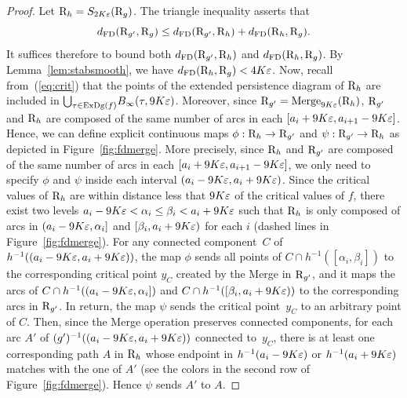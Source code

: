 \begin{proof}
Let $\mathrm{R}_h=S_{2K\varepsilon}(\mathrm{R}_g)$.
The triangle inequality asserts that 
\[
d_{\rm FD}(\mathrm{R}_{g'},\mathrm{R}_g)\leq d_{\rm FD}(\mathrm{R}_{g'},\mathrm{R}_h)+d_{\rm FD}(\mathrm{R}_h,\mathrm{R}_g).
\]
It suffices therefore to bound both
$d_{\rm FD}(\mathrm{R}_{g'},\mathrm{R}_h)$ and $d_{\rm FD}(\mathrm{R}_h,\mathrm{R}_{g})$.
By Lemma~\ref{lem:stabsmooth}, we have $d_{\rm FD}(\mathrm{R}_h,\mathrm{R}_g) < 4K\varepsilon$.
Now, recall from~(\ref{eq:crit}) that the points of the extended
persistence diagram of $\mathrm{R}_h$ are included in
${\bigcup}_{\tau\in\mathrm{ExDg}(f)} B_\infty(\tau,9K\varepsilon)$.  Moreover, since
$\mathrm{R}_{g'}=\mathrm{Merge}_{9K\varepsilon}(\mathrm{R}_h)$, $\mathrm{R}_{g'}$ and $\mathrm{R}_h$ are
composed of the same number of arcs in each $[a_i+9K\varepsilon,a_{i+1}-9K\varepsilon]$.
Hence, we can define explicit continuous maps
$\phi:\mathrm{R}_h\rightarrow\mathrm{R}_{g'}$ and
$\psi:\mathrm{R}_{g'}\rightarrow\mathrm{R}_h$ as depicted in
Figure~\ref{fig:fdmerge}.  More precisely, since $\mathrm{R}_h$ and
$\mathrm{R}_{g'}$ are composed of the same number of arcs in each
$[a_i+9K\varepsilon,a_{i+1}-9K\varepsilon]$, we only need to specify $\phi$ and $\psi$
inside each interval $(a_i-9K\varepsilon,a_i+9K\varepsilon)$.  Since the critical values
of $\mathrm{R}_h$ are within distance less that $9K\varepsilon$ of the critical
values of $f$, there exist two levels $a_i-9K\varepsilon < \alpha_i\leq\beta_i
< a_i+9K\varepsilon$ such that $\mathrm{R}_h$ is only composed of arcs in
$(a_i-9K\varepsilon,\alpha_i]$ and $[\beta_i,a_i+9K\varepsilon)$ for each $i$ (dashed
    lines in Figure~\ref{fig:fdmerge}).  For any connected component~$C$ of
    $h^{-1}((a_i-9K\varepsilon,a_i+9K\varepsilon))$, the map $\phi$ sends all points of
    $C\cap h^{-1}([\alpha_i,\beta_i])$ to the corresponding critical
    point $y_C$ created by the Merge in $\mathrm{R}_{g'}$, and it maps the
    arcs of $C\cap h^{-1}((a_i-9K\varepsilon,\alpha_i])$ and $C\cap
    h^{-1}([\beta_i,a_i+9K\varepsilon))$ to the corresponding arcs in
    $\mathrm{R}_{g'}$.  In return, the map $\psi$ sends the critical
    point~$y_C$ to an arbitrary point of $C$.  Then, since the Merge
    operation preserves connected components, for each arc $A'$ of
    $(g')^{-1}((a_i-9K\varepsilon,a_i+9K\varepsilon))$ connected to~$y_C$, there is at
    least one corresponding path $A$ in $\mathrm{R}_h$ whose endpoint in
    $h^{-1}(a_i-9K\varepsilon)$ or $h^{-1}(a_i+9K\varepsilon)$ matches with the one of $A'$
    (see the colors in the second row of Figure~\ref{fig:fdmerge}).  Hence $\psi$ sends
    $A'$ to $A$.


\end{proof}
